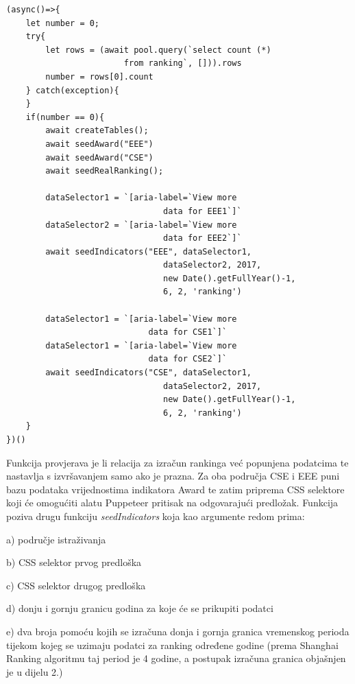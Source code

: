 \documentclass[times, utf8, zavrsni]{fer}
\begin{document}
\begin{verbatim}  
(async()=>{
    let number = 0;
    try{
        let rows = (await pool.query(`select count (*) 
                        from ranking`, [])).rows
        number = rows[0].count
    } catch(exception){
    }
    if(number == 0){
        await createTables();
        await seedAward("EEE")
        await seedAward("CSE")
        await seedRealRanking();
            
        dataSelector1 = `[aria-label=`View more 
                                data for EEE1`]`
        dataSelector2 = `[aria-label=`View more 
                                data for EEE2`]`
        await seedIndicators("EEE", dataSelector1, 
                                dataSelector2, 2017, 
                                new Date().getFullYear()-1, 
                                6, 2, 'ranking')
    
        dataSelector1 = `[aria-label=`View more
                             data for CSE1`]`
        dataSelector1 = `[aria-label=`View more
                             data for CSE2`]`
        await seedIndicators("CSE", dataSelector1, 
                                dataSelector2, 2017, 
                                new Date().getFullYear()-1,
                                6, 2, 'ranking')
    }
})()
\end{verbatim}    
Funkcija provjerava je li relacija za izračun rankinga već popunjena podatcima te \\nastavlja s izvršavanjem samo ako je prazna. 
Za oba područja CSE i EEE puni bazu podataka vrijednostima indikatora Award te zatim priprema CSS selektore koji će omogućiti alatu 
Puppeteer pritisak na odgovarajući predložak. Funkcija poziva drugu funkciju \emph{seedIndicators} koja kao argumente redom prima:

    a) područje istraživanja
    
    b) CSS selektor prvog predloška 

    c) CSS selektor drugog predloška
    
    d) donju i gornju granicu godina za koje će se prikupiti podatci
    
    e) dva broja pomoću kojih se izračuna donja i gornja granica vremenskog perioda tijekom kojeg se uzimaju podatci za ranking određene godine
        (prema Shanghai \\Ranking algoritmu taj period je 4 godine, a postupak izračuna granica objašnjen je u dijelu 2.)
      
\end{document}
